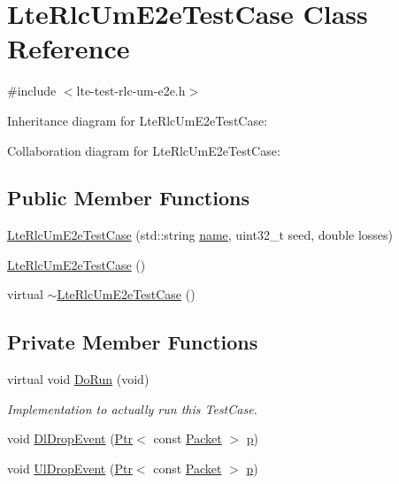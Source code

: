 \hypertarget{classLteRlcUmE2eTestCase}{}\section{Lte\+Rlc\+Um\+E2e\+Test\+Case Class Reference}
\label{classLteRlcUmE2eTestCase}


{\ttfamily \#include $<$lte-\/test-\/rlc-\/um-\/e2e.\+h$>$}



Inheritance diagram for Lte\+Rlc\+Um\+E2e\+Test\+Case\+:


Collaboration diagram for Lte\+Rlc\+Um\+E2e\+Test\+Case\+:
\subsection*{Public Member Functions}
\begin{DoxyCompactItemize}
\item 
\hyperlink{classLteRlcUmE2eTestCase_a866a46be9353f03e8f49e502215a46ac}{Lte\+Rlc\+Um\+E2e\+Test\+Case} (std\+::string \hyperlink{generate__test__data__lte__spectrum__model_8m_ab74e6bf80237ddc4109968cedc58c151}{name}, uint32\+\_\+t seed, double losses)
\item 
\hyperlink{classLteRlcUmE2eTestCase_a76ac2ce13bbabcae93b63da4cd426ef6}{Lte\+Rlc\+Um\+E2e\+Test\+Case} ()
\item 
virtual \hyperlink{classLteRlcUmE2eTestCase_ade613bc9f9296b1a0f8f4872094243fd}{$\sim$\+Lte\+Rlc\+Um\+E2e\+Test\+Case} ()
\end{DoxyCompactItemize}
\subsection*{Private Member Functions}
\begin{DoxyCompactItemize}
\item 
virtual void \hyperlink{classLteRlcUmE2eTestCase_afa983387e011c31df96206ec0c772127}{Do\+Run} (void)
\begin{DoxyCompactList}\small\item\em Implementation to actually run this Test\+Case. \end{DoxyCompactList}\item 
void \hyperlink{classLteRlcUmE2eTestCase_a47966471970a9529eca31f78c36b298d}{Dl\+Drop\+Event} (\hyperlink{classns3_1_1Ptr}{Ptr}$<$ const \hyperlink{classns3_1_1Packet}{Packet} $>$ \hyperlink{lte__link__budget__x2__handover__measures_8m_ac9de518908a968428863f829398a4e62}{p})
\item 
void \hyperlink{classLteRlcUmE2eTestCase_a2dd32f7d3c37f04911d45678d0141c40}{Ul\+Drop\+Event} (\hyperlink{classns3_1_1Ptr}{Ptr}$<$ const \hyperlink{classns3_1_1Packet}{Packet} $>$ \hyperlink{lte__link__budget__x2__handover__measures_8m_ac9de518908a968428863f829398a4e62}{p})
\end{DoxyCompactItemize}
